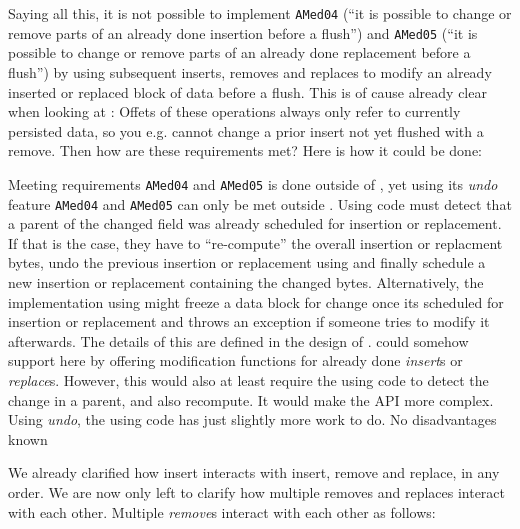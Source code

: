 Saying all this, it is not possible to implement \texttt{AMed04} (``it is possible to change or remove parts of an already done insertion before a flush'') and  \texttt{AMed05} (``it is possible to change or remove parts of an already done replacement before a flush'') by using subsequent inserts, removes and replaces to modify an already inserted or replaced block of data before a flush. This is of cause already clear when looking at : Offets of these operations always only refer to currently persisted data, so you e.g. cannot change a prior insert not yet flushed with a remove. Then how are these requirements met? Here is how it could be done:

{%
Meeting requirements \texttt{AMed04} and  \texttt{AMed05} is done outside of \COMPmedia{}, yet using its \emph{undo} feature
}
{%
\texttt{AMed04} and \texttt{AMed05} can only be met outside \COMPmedia{}. Using code must detect that a parent of the changed field was already scheduled for insertion or replacement. If that is the case, they have to ``re-compute'' the overall insertion or replacment bytes, undo the previous insertion or replacement using \COMPmedia{} and finally schedule a new insertion or replacement containing the changed bytes. Alternatively, the implementation using \COMPmedia{} might freeze a data block for change once its scheduled for insertion or replacement and throws an exception if someone tries to modify it afterwards. The details of this are defined in the design of \COMPdataPartManagement{}.
}
{%
\COMPmedia{} could somehow support here by offering modification functions for already done \emph{insert}s or \emph{replace}s. However, this would also at least require the using code to detect the change in a parent, and also recompute. It would make the API more complex. Using \emph{undo}, the using code has just slightly more work to do.
}
{%
No disadvantages known
}

We already clarified how insert interacts with insert, remove and replace, in any order. We are now only left to clarify how multiple removes and replaces interact with each other. Multiple \emph{remove}s interact with each other as follows:

